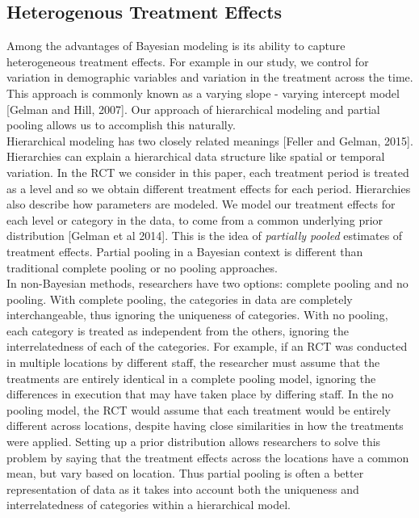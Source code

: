 \documentclass{article}
\begin{document}
\subsection{Heterogenous Treatment Effects}
Among the advantages of Bayesian modeling is its ability to capture heterogeneous treatment effects. For example in our study, we control for variation in demographic variables and variation in the treatment across the time. This approach is commonly known as a varying slope - varying intercept model [Gelman and Hill, 2007]. Our approach of hierarchical modeling and partial pooling allows us to accomplish this naturally. \\
Hierarchical modeling has two closely related meanings [Feller and Gelman, 2015]. Hierarchies can explain a hierarchical data structure like spatial or temporal variation. In the RCT we consider in this paper, each treatment period is treated as a level and so we obtain different treatment effects for each period. Hierarchies also describe how parameters are modeled. We model our treatment effects for each level or category in the data, to come from a common underlying prior distribution [Gelman et al 2014]. This is the idea of \textit{partially pooled} estimates of treatment effects. Partial pooling in a Bayesian context is different than traditional complete pooling or no pooling approaches. \\
In non-Bayesian methods, researchers have two options: complete pooling and no pooling. With complete pooling, the categories in data are completely interchangeable, thus ignoring the uniqueness of categories. With no pooling, each category is treated as independent from the others, ignoring the interrelatedness of each of the categories.  For example, if an RCT was conducted in multiple locations by different staff, the researcher must assume that the treatments are entirely identical in a complete pooling model, ignoring the differences in execution that may have taken place by differing staff. In the no pooling model, the RCT would assume that each treatment would be entirely different across locations, despite having close similarities in how the treatments were applied. Setting up a prior distribution allows researchers to solve this problem by saying that the treatment effects across the locations have a common mean, but vary based on location. Thus partial pooling is often a better representation of data as it takes into account both the uniqueness and interrelatedness of categories within a hierarchical model.
\end{document}
